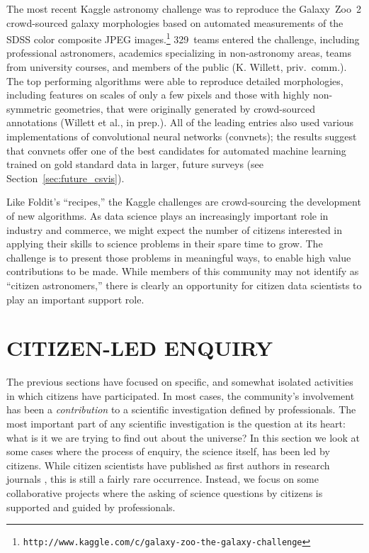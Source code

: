 \documentclass{ar2e}
\def\Sref#1{Section~\ref{#1}\xspace}
\def\url#1{\texttt{#1}}
\begin{document}
The most recent Kaggle astronomy challenge was to reproduce the Galaxy~Zoo~2
crowd-sourced galaxy morphologies based on automated measurements of the SDSS
color composite JPEG
images.\footnote{\url{http://www.kaggle.com/c/galaxy-zoo-the-galaxy-challenge}}
329~teams entered the challenge, including professional astronomers, academics
specializing in non-astronomy areas, teams from university courses,  and members
of the public (K. Willett, priv.\ comm.).  The top performing algorithms were
able to reproduce detailed morphologies, including features on scales of only a
few pixels and those with highly non-symmetric geometries, that were originally
generated by crowd-sourced annotations (Willett et al., in prep.). All of the
leading entries also used various implementations of convolutional neural
networks (convnets); the results suggest that convnets offer one of the best
candidates for automated machine learning trained on gold standard data in
larger, future surveys (see \Sref{sec:future_csvis}). 

Like Foldit's ``recipes,'' the Kaggle challenges are crowd-sourcing the
development of new algorithms. As data science plays an increasingly important
role in industry and commerce, we might expect the number of citizens
interested in applying their skills to science problems in their spare time to
grow. The challenge is to present those problems in meaningful ways, to enable
high value contributions to be made. While members of this community may not
identify as ``citizen astronomers,'' there is clearly an opportunity for
citizen data scientists to play an important support role.



\section{CITIZEN-LED ENQUIRY}
\label{sec:explore}

The previous sections have focused on specific, and somewhat  isolated
activities in which citizens have participated. In most cases, the community's
involvement has been a {\it contribution} to a scientific investigation defined
by professionals. The most important part of any scientific investigation is the
question at its heart: what is it we are trying to find out about the universe?
In this section we look at some cases where the process of enquiry, the science
itself, has been led by citizens. While citizen scientists have published as
first authors in research journals \citep[see e.g.]{Hui2013,Liang2014},  this is
still a fairly rare occurrence. Instead, we focus on some collaborative projects
where the asking of science questions by citizens is supported and guided by
professionals.
\end{document}
